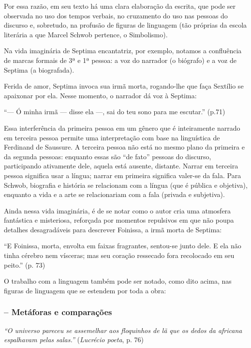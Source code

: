 \documentclass[12pt]{extarticle}
\begin{document}
Por essa razão, em seu texto há uma clara elaboração da escrita, que
pode ser observada no uso dos tempos verbais, no cruzamento do uso nas
pessoas do discurso e, sobretudo, na profusão de figuras de linguagem
(tão próprias da escola literária a que Marcel Schwob pertence, o
Simbolismo).

Na vida imaginária de Septima encantatriz, por exemplo, notamos a
confluência de marcas formais de 3ª e 1ª pessoa: a voz do narrador (o
biógrafo) e a voz de Septima (a biografada).

Ferida de amor, Septima invoca sua irmã morta, rogando-lhe que faça
Sextílio se apaixonar por ela. Nesse momento, o narrador dá voz à
Septima:

``--- Ó minha irmã --- disse ela ---, sai do teu sono para me escutar.''
(p.71)

Essa interferência da primeira pessoa em um gênero que é inteiramente
narrado em terceira pessoa permite uma interpretação com base na
linguística de Ferdinand de Saussure. A terceira pessoa não está no
mesmo plano da primeira e da segunda pessoas: enquanto essas são ``de
fato'' pessoas do discurso, participando ativamente dele, aquela está
ausente, distante. Narrar em terceira pessoa significa usar a língua;
narrar em primeira significa valer-se da fala. Para Schwob, biografia e
história se relacionam com a língua (que é pública e objetiva), enquanto
a vida e a arte se relacionariam com a fala (privada e subjetiva).

Ainda nessa vida imaginária, é de se notar como o autor cria uma
atmosfera fantástica e misteriosa, reforçada por momentos repulsivos em
que não poupa detalhes desagradáveis para descrever Foinissa, a irmã
morta de Septima:

``E Foinissa, morta, envolta em faixas fragrantes, sentou-se junto dele.
E ela não tinha cérebro nem vísceras; mas seu coração ressecado fora
recolocado em seu peito.'' (p. 73)

O trabalho com a linguagem também pode ser notado, como dito acima, nas
figuras de linguagem que se estendem por toda a obra:


\subsubsection{-- Metáforas e comparações}

\emph{``O universo pareceu se assemelhar aos floquinhos de lã que os
dedos da africana espalhavam pelas salas.''} (\emph{Lucrécio poeta}, p.
76)
\end{document}
